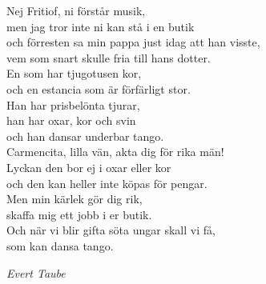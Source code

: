 \documentclass[a6paper,10pt]{article}
\begin{document}
\newpage
\setlength{\oddsidemargin}{-0.47in}
\noindent
Nej Fritiof, ni förstår musik, \\
men jag tror inte ni kan stå i en butik \\
och förresten sa min pappa just idag att han visste, \\
vem som snart skulle fria till hans dotter. \\
En som har tjugotusen kor, \\
och en estancia som är förfärligt stor. \\
Han har prisbelönta tjurar, \\
han har oxar, kor och svin \\
och han dansar underbar tango. 
\vspace{5pt}\\
Carmencita, lilla vän, akta dig för rika män! \\
Lyckan den bor ej i oxar eller kor \\
och den kan heller inte köpas för pengar. \\
Men min kärlek gör dig rik, \\
skaffa mig ett jobb i er butik. \\
Och när vi blir gifta söta ungar skall vi få, \\
som kan dansa tango.
\begin{flushright}
\textit{Evert Taube}
\end{flushright}
	    
\end{document}
